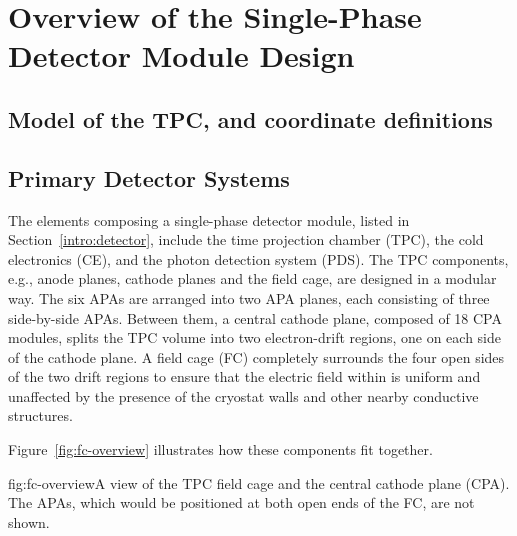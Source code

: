 \chapter{Overview of the Single-Phase Detector Module Design}
\label{ch:fdsp-ov}

\section{Model of the TPC, and coordinate definitions}
\label{sec:fdsp-ov-model}


\section{Primary Detector Systems}
\label{sec:fdsp-ov-sys}



The elements composing a single-phase detector module, listed in Section~\ref{intro:detector}, include the time projection chamber (TPC), the cold electronics (CE), and the photon detection system (PDS).  The TPC components, e.g., anode planes, cathode planes and the field cage, are designed in a modular way.  
The six APAs are arranged into two APA planes, each consisting of three side-by-side APAs. Between them,  
a central cathode plane, composed of 18 CPA modules, splits the TPC volume into two electron-drift regions, one on each side of the cathode plane. 
A field cage (FC) completely surrounds the four
open sides of the two drift regions to ensure that the electric field within is uniform and unaffected by the presence of the cryostat walls and other nearby conductive structures. 

Figure~\ref{fig:fc-overview} illustrates how these components fit together.


\begin{dunefigure}{fig:fc-overview}{A view of the TPC field cage and the central cathode plane (CPA). The APAs, which would be positioned at both open ends of the FC, are not shown.}
\end{dunefigure}

